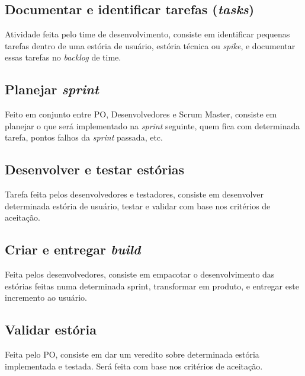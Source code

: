 \subsection{Documentar e identificar tarefas (\emph{tasks})}
Atividade feita pelo time de desenvolvimento, consiste em identificar pequenas tarefas dentro de uma estória de usuário, estória técnica ou \emph{spike}, e documentar essas tarefas no \emph{backlog} de time.

\subsection{Planejar \emph{sprint}}
Feito em conjunto entre PO, Desenvolvedores e Scrum Master, consiste em planejar o que será implementado na \emph{sprint} seguinte, quem fica com determinada tarefa, pontos falhos da \emph{sprint} passada, etc.

\subsection{Desenvolver e testar estórias}
Tarefa feita pelos desenvolvedores e testadores, consiste em desenvolver determinada estória de usuário, testar e validar com base nos critérios de aceitação.

\subsection{Criar e entregar \emph{build}}
Feita pelos desenvolvedores, consiste em empacotar o desenvolvimento das estórias feitas numa determinada sprint, transformar em produto, e entregar este incremento ao usuário.

\subsection{Validar estória}
Feita pelo PO, consiste em dar um veredito sobre determinada estória implementada e testada. Será feita com base nos critérios de aceitação.